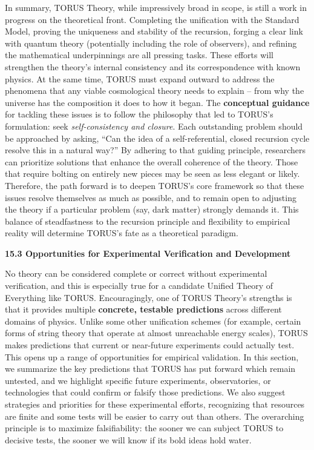 \documentclass[]{article}
\begin{document}
In summary, TORUS Theory, while impressively broad in scope, is still a
work in progress on the theoretical front. Completing the unification
with the Standard Model, proving the uniqueness and stability of the
recursion, forging a clear link with quantum theory (potentially
including the role of observers), and refining the mathematical
underpinnings are all pressing tasks. These efforts will strengthen the
theory's internal consistency and its correspondence with known physics.
At the same time, TORUS must expand outward to address the phenomena
that any viable cosmological theory needs to explain -- from why the
universe has the composition it does to how it began. The
\textbf{conceptual guidance} for tackling these issues is to follow the
philosophy that led to TORUS's formulation: seek \emph{self-consistency
and closure}. Each outstanding problem should be approached by asking,
``Can the idea of a self-referential, closed recursion cycle resolve
this in a natural way?'' By adhering to that guiding principle,
researchers can prioritize solutions that enhance the overall coherence
of the theory. Those that require bolting on entirely new pieces may be
seen as less elegant or likely. Therefore, the path forward is to deepen
TORUS's core framework so that these issues resolve themselves as much
as possible, and to remain open to adjusting the theory if a particular
problem (say, dark matter) strongly demands it. This balance of
steadfastness to the recursion principle and flexibility to empirical
reality will determine TORUS's fate as a theoretical paradigm.

\textbf{15.3 Opportunities for Experimental Verification and
Development}

No theory can be considered complete or correct without experimental
verification, and this is especially true for a candidate Unified Theory
of Everything like TORUS. Encouragingly, one of TORUS Theory's strengths
is that it provides multiple \textbf{concrete, testable predictions}
across different domains of physics. Unlike some other unification
schemes (for example, certain forms of string theory that operate at
almost unreachable energy scales), TORUS makes predictions that current
or near-future experiments could actually test​. This opens up a range
of opportunities for empirical validation. In this section, we summarize
the key predictions that TORUS has put forward which remain untested,
and we highlight specific future experiments, observatories, or
technologies that could confirm or falsify those predictions. We also
suggest strategies and priorities for these experimental efforts,
recognizing that resources are finite and some tests will be easier to
carry out than others. The overarching principle is to maximize
falsifiability: the sooner we can subject TORUS to decisive tests, the
sooner we will know if its bold ideas hold water.
\end{document}
